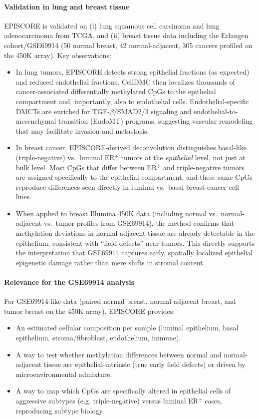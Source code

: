 \documentclass[10pt]{extarticle}
\begin{document}
\paragraph{Validation in lung and breast tissue}
EPISCORE is validated on (i) lung squamous cell carcinoma and lung adenocarcinoma from TCGA, and (ii) breast tissue data including the Erlangen cohort/GSE69914 (50 normal breast, 42 normal-adjacent, 305 cancers profiled on the 450K array).  
Key observations:
\begin{itemize}[label=-]
    \item In lung tumors, EPISCORE detects strong epithelial fractions (as expected) and reduced endothelial fractions. CellDMC then localizes thousands of cancer-associated differentially methylated CpGs to the epithelial compartment and, importantly, also to endothelial cells. Endothelial-specific DMCTs are enriched for TGF-$\beta$/SMAD2/3 signaling and endothelial-to-mesenchymal transition (EndoMT) programs, suggesting vascular remodeling that may facilitate invasion and metastasis.
    \item In breast cancer, EPISCORE-derived deconvolution distinguishes basal-like (triple-negative) vs.\ luminal ER$^+$ tumors at the \textit{epithelial} level, not just at bulk level. Most CpGs that differ between ER$^+$ and triple-negative tumors are assigned specifically to the epithelial compartment, and these same CpGs reproduce differences seen directly in luminal vs.\ basal breast cancer cell lines.  
    \item When applied to breast Illumina 450K data (including normal vs.\ normal-adjacent vs.\ tumor profiles from GSE69914), the method confirms that methylation deviations in normal-adjacent tissue are already detectable in the epithelium, consistent with ``field defects'' near tumors. This directly supports the interpretation that GSE69914 captures early, spatially localized epithelial epigenetic damage rather than mere shifts in stromal content.
\end{itemize}

\paragraph{Relevance for the GSE69914 analysis}
For GSE69914-like data (paired normal breast, normal-adjacent breast, and tumor breast on the 450K array), EPISCORE provides:
\begin{itemize}[label=-]
    \item An estimated cellular composition per sample (luminal epithelium, basal epithelium, stroma/fibroblast, endothelium, immune).
    \item A way to test whether methylation differences between normal and normal-adjacent tissue are epithelial-intrinsic (true early field defects) or driven by microenvironmental admixture.
    \item A way to map which CpGs are specifically altered in epithelial cells of aggressive subtypes (e.g. triple-negative) versus luminal ER$^+$ cases, reproducing subtype biology.
\end{itemize}
\end{document}
